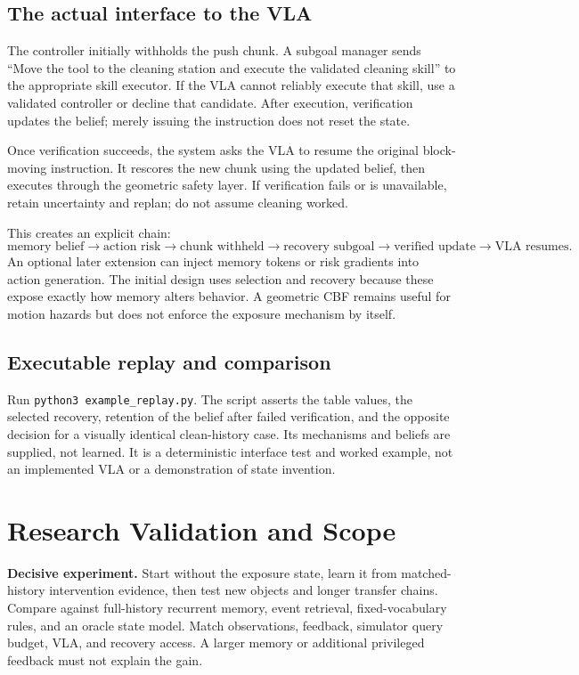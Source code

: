 \documentclass[10pt]{article}
\begin{document}
\subsection{The actual interface to the VLA}
The controller initially withholds the push chunk. A subgoal manager sends ``Move the tool to the cleaning station and execute the validated cleaning skill'' to the appropriate skill executor. If the VLA cannot reliably execute that skill, use a validated controller or decline that candidate. After execution, verification updates the belief; merely issuing the instruction does not reset the state.

Once verification succeeds, the system asks the VLA to resume the original block-moving instruction. It rescores the new chunk using the updated belief, then executes through the geometric safety layer. If verification fails or is unavailable, retain uncertainty and replan; do not assume cleaning worked.

This creates an explicit chain:
\[
\text{memory belief}\rightarrow\text{action risk}\rightarrow\text{chunk withheld}
\rightarrow\text{recovery subgoal}\rightarrow\text{verified update}\rightarrow\text{VLA resumes}.
\]
An optional later extension can inject memory tokens or risk gradients into action generation. The initial design uses selection and recovery because these expose exactly how memory alters behavior. A geometric CBF remains useful for motion hazards but does not enforce the exposure mechanism by itself.

\subsection{Executable replay and comparison}
Run \texttt{python3 example\_replay.py}. The script asserts the table values, the selected recovery, retention of the belief after failed verification, and the opposite decision for a visually identical clean-history case. Its mechanisms and beliefs are supplied, not learned. It is a deterministic interface test and worked example, not an implemented VLA or a demonstration of state invention.

\newpage
\section{Research Validation and Scope}
\textbf{Decisive experiment.} Start without the exposure state, learn it from matched-history intervention evidence, then test new objects and longer transfer chains. Compare against full-history recurrent memory, event retrieval, fixed-vocabulary rules, and an oracle state model. Match observations, feedback, simulator query budget, VLA, and recovery access. A larger memory or additional privileged feedback must not explain the gain.
\end{document}

